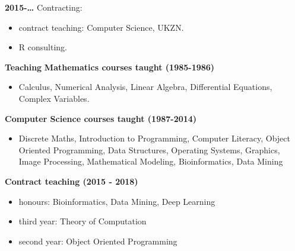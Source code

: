 \begin{description}
\begin{description}
{\bf 2015-\ldots}
Contracting:

\begin{itemize}
\item contract teaching: Computer Science, UKZN.
\item R consulting.
\end{itemize}


\newpage
\item[] {\large \bf Teaching}\newline
\newline
{\large \bf Mathematics courses taught (1985-1986)}

 \begin{itemize} 
  \item[] Calculus, Numerical Analysis, Linear Algebra, \newline
       Differential Equations, Complex Variables.
 \end{itemize}

{\large \bf  Computer Science courses taught (1987-2014)}
\begin{itemize}
\item[]  Discrete Maths, Introduction to Programming, Computer Literacy, \newline
             Object Oriented Programming, Data Structures, \newline
             Operating Systems, Graphics, \newline
             Image Processing, Mathematical Modeling, \newline
             Bioinformatics, Data Mining
\end{itemize}


{\large \bf Contract teaching (2015 - 2018)}
\begin{itemize}
	\item[] honours: Bioinformatics, Data Mining, Deep Learning
	\item[] third year: Theory of Computation
	\item[] second year: Object Oriented Programming
\end{itemize}


\end{description}
\end{description}
\label{f0}
